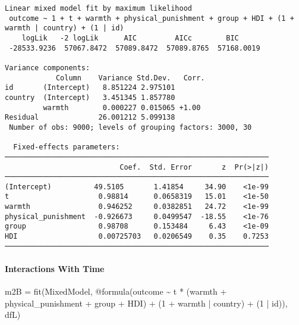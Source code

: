 \documentclass[
  letterpaper,
  DIV=11,
  numbers=noendperiod]{scrreprt}
\let\oldparagraph\paragraph
\renewcommand{\paragraph}[1]{\oldparagraph{#1}\mbox{}}
\newenvironment{Shaded}{\begin{snugshade}}{\end{snugshade}}
\newcommand{\FloatTok}[1]{\textcolor[rgb]{0.68,0.00,0.00}{#1}}
\newcommand{\FunctionTok}[1]{\textcolor[rgb]{0.28,0.35,0.67}{#1}}
\newcommand{\NormalTok}[1]{\textcolor[rgb]{0.00,0.23,0.31}{#1}}
\newcommand{\OperatorTok}[1]{\textcolor[rgb]{0.37,0.37,0.37}{#1}}
\newcommand{\PreprocessorTok}[1]{\textcolor[rgb]{0.68,0.00,0.00}{#1}}
\begin{document}
\begin{verbatim}
Linear mixed model fit by maximum likelihood
 outcome ~ 1 + t + warmth + physical_punishment + group + HDI + (1 + warmth | country) + (1 | id)
    logLik   -2 logLik      AIC         AICc        BIC     
 -28533.9236  57067.8472  57089.8472  57089.8765  57168.0019

Variance components:
            Column    Variance Std.Dev.   Corr.
id       (Intercept)   8.851224 2.975101
country  (Intercept)   3.451345 1.857780
         warmth        0.000227 0.015065 +1.00
Residual              26.001212 5.099138
 Number of obs: 9000; levels of grouping factors: 3000, 30

  Fixed-effects parameters:
──────────────────────────────────────────────────────────────
                           Coef.  Std. Error       z  Pr(>|z|)
──────────────────────────────────────────────────────────────
(Intercept)          49.5105       1.41854     34.90    <1e-99
t                     0.98814      0.0658319   15.01    <1e-50
warmth                0.946252     0.0382851   24.72    <1e-99
physical_punishment  -0.926673     0.0499547  -18.55    <1e-76
group                 0.98708      0.153484     6.43    <1e-09
HDI                   0.00725703   0.0206549    0.35    0.7253
──────────────────────────────────────────────────────────────
\end{verbatim}

\paragraph{Interactions With Time}\label{interactions-with-time-2}

\begin{Shaded}
\begin{Highlighting}[]

\NormalTok{m2B }\OperatorTok{=} \FunctionTok{fit}\NormalTok{(MixedModel, }\PreprocessorTok{@formula}\NormalTok{(outcome }\OperatorTok{\textasciitilde{}}\NormalTok{ t }\OperatorTok{*}\NormalTok{ (warmth }\OperatorTok{+} 
\NormalTok{                                 physical\_punishment }\OperatorTok{+} 
\NormalTok{                                 group }\OperatorTok{+}\NormalTok{ HDI) }\OperatorTok{+}
\NormalTok{                                 (}\FloatTok{1} \OperatorTok{+}\NormalTok{ warmth }\OperatorTok{|}\NormalTok{ country) }\OperatorTok{+}
\NormalTok{                                 (}\FloatTok{1} \OperatorTok{|}\NormalTok{ id)), dfL)}
\end{Highlighting}
\end{Shaded}
\end{document}
